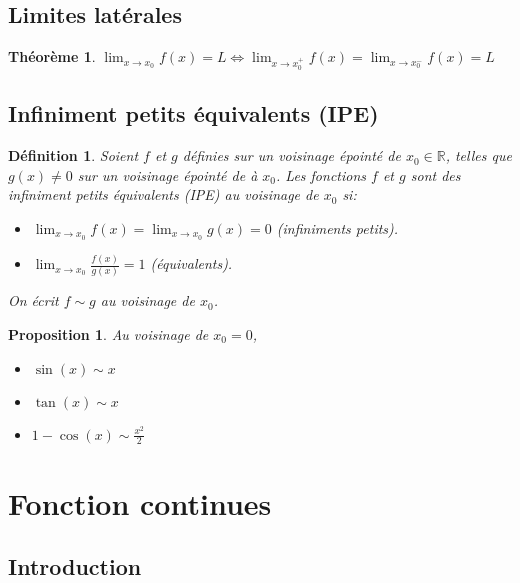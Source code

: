 \documentclass[10pt,a4paper]{book}
\newcommand{\R}{\mathbb{R}}
\newtheorem{theorem}{Théorème}[section]
\newtheorem{definition}{Définition}[section]
\newtheorem{proposition}{Proposition}[section]
\begin{document}
\section{Limites latérales}

\begin{theorem}
$\lim_{x \rightarrow x_0} f(x) = L \Longleftrightarrow \lim_{x \rightarrow x_0^+} f(x) = \lim_{x \rightarrow x_0^-} f(x) = L$
\end{theorem}

\section{Infiniment petits équivalents (IPE)}

\begin{definition}
Soient $f$ et $g$ définies sur un voisinage épointé de $x_0 \in \R$, telles que $g(x) \neq 0$ sur un voisinage épointé de à $x_0$. Les fonctions $f$ et $g$ sont des infiniment petits équivalents (IPE) au voisinage de $x_0$ si:
\begin{itemize}
\item $\lim_{x \rightarrow x_0} f(x) = \lim_{x \rightarrow x_0} g(x) = 0$ (infiniments petits).
\item $\lim_{x \rightarrow x_0} \frac{f(x)}{g(x)} = 1$ (équivalents).
\end{itemize}
On écrit $f \sim g$ au voisinage de $x_0$.
\end{definition}

\begin{proposition}
Au voisinage de $x_0 = 0$,
\begin{itemize}
\item $\sin(x) \sim x$
\item $\tan(x) \sim x$
\item $1 - \cos(x) \sim \frac{x^2}{2}$
\end{itemize}
\end{proposition}

\chapter{Fonction continues}

\section{Introduction}
\end{document}
